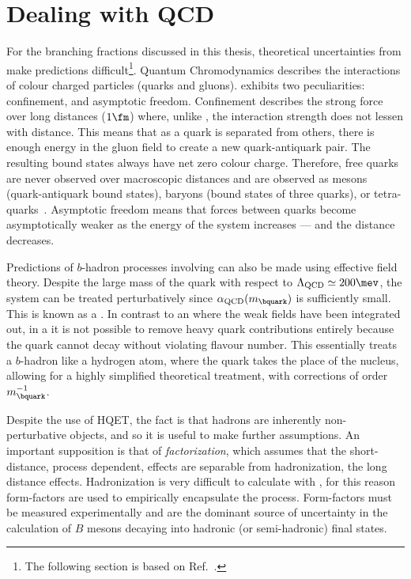 \section{Dealing with QCD}

For the branching fractions discussed in this thesis, theoretical uncertainties from \QCD make
predictions difficult\footnote{
  The following section is based on Ref.~\cite{Pich:1998xt}.
}.
Quantum Chromodynamics describes the interactions of colour charged particles (quarks and
gluons).
\QCD exhibits two peculiarities: confinement, and asymptotic freedom.
Confinement describes the strong force over long distances (\approx$1\fm$)
where, unlike \QED, the interaction strength does not lessen with distance.
This means that as a quark is separated from others, there is enough energy in the gluon field to
create a new quark-antiquark pair.
The resulting bound states always have net zero colour charge.
Therefore, free quarks are never observed over macroscopic distances
and are observed as mesons (quark-antiquark bound states), baryons (bound states of
three quarks), or tetra-quarks~\cite{LHCb-PAPER-2014-014}.
Asymptotic freedom means that forces between quarks become asymptotically weaker as the energy of
the system increases --- and the distance decreases.

Predictions of $b$-hadron processes involving \QCD can also be made using effective field theory.
Despite the large mass of the \bquark quark with respect to $\Lambda_\mathrm{QCD}\simeq200\mev$,
the system can be treated perturbatively since $\alpha_\mathrm{QCD}(m_\bquark)$ is sufficiently
small.
This is known as a \HQET.
In contrast to an \EFT where the weak fields have been integrated out, in a \HQET
it is not possible to remove heavy quark contributions entirely because the \bquark quark
cannot decay without violating flavour number.
This essentially treats a $b$-hadron like a hydrogen atom, where the \bquark quark takes
the place of the nucleus, allowing for a highly simplified theoretical treatment, with corrections
of order $m_\bquark^{-1}$.

Despite the use of HQET, the fact is that hadrons are inherently non-perturbative objects, and so
it is useful to make further assumptions.
An important supposition is that of \emph{factorization}, which assumes that the short-distance,
process dependent, \QCD effects are separable from hadronization, the long distance effects.
Hadronization is very difficult to calculate with \QCD, for this reason form-factors are used to
empirically encapsulate the process.
Form-factors must be measured experimentally and are the dominant source of uncertainty in the
calculation of $B$ mesons decaying into hadronic (or semi-hadronic) final states.






